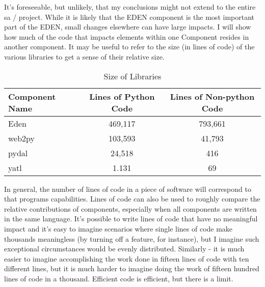 \documentclass[a4paper,man,natbib,floatsintext]{apa6}
\begin{document}
  It's foreseeable, but unlikely, that my conclusions might not extend to the entire \gls{sa} / project. While it is likely that the \gls{EDEN} component is the most important part of the \gls{EDEN}, small changes elsewhere can have large impacts. I will show how much of the code that impacts elements within one Component resides in another component. It may be useful to refer to the size (in lines of code) of the various libraries to get a sense of their relative size. 

  \begin{table}[ht]
  \caption{Size of Libraries}
  \label{tab:table-2}
  \begin{tabular}{|l|c|c|}
  \hline
  Component Name & Lines of Python Code & Lines of Non-python Code \\ \hline
  Eden           & 469,117              & 793,661                  \\ \hline
  web2py         & 103,593              & 41,793                   \\ \hline
  pydal          & 24,518               & 416                      \\ \hline
  yatl           & 1.131                & 69                       \\ \hline
  \end{tabular}
\end{table}

  In general, the number of lines of code in a piece of software will correspond to that programs capabilities. Lines of code can also be used to roughly compare the relative contributions of components, especially when all components are written in the same language. It's possible to write lines of code that have no meaningful impact and it's easy to imagine scenarios where single lines of code make thousands meaningless (by turning off a feature, for instance), but I imagine such exceptional circumstances would be evenly distributed. Similarly -  it is much easier to imagine accomplishing the work done in fifteen lines of code with ten different lines, but it is much harder to imagine doing the work of fifteen hundred lines of code in a thousand. Efficient code is efficient, but there is a limit.
  \newpage

\end{document}
